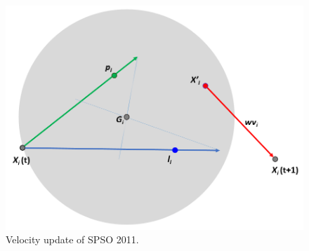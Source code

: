 


\begin{figure}[!t] \centering
\includegraphics[width=4.5in]{SPSO_2011}
\caption{Velocity update of SPSO 2011.}\label{fig:SPSO_2011}
\end{figure} 


